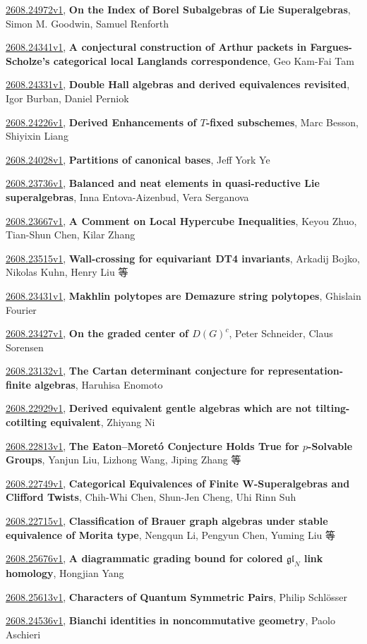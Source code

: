 \documentclass[9pt, a4paper]{article}
\theoremstyle{plain}
\theoremstyle{definition}
\theoremstyle{remark}
\newcommand{\arxiv}[3]{\href{https://arxiv.org/abs/#1}{#1}, \textbf{\textcolor{arxivblue}{#2}}, #3}
\begin{document}
\arxiv{2608.24972v1}{On the Index of Borel Subalgebras of Lie Superalgebras}{Simon M. Goodwin, Samuel Renforth}

\arxiv{2608.24341v1}{A conjectural construction of Arthur packets in Fargues-Scholze's categorical local Langlands correspondence}{Geo Kam-Fai Tam}

\arxiv{2608.24331v1}{Double Hall algebras and derived equivalences revisited}{Igor Burban, Daniel Perniok}

\arxiv{2608.24226v1}{Derived Enhancements of $T$-fixed subschemes}{Marc Besson, Shiyixin Liang}

\arxiv{2608.24028v1}{Partitions of canonical bases}{Jeff York Ye}

\arxiv{2608.23736v1}{Balanced and neat elements in quasi-reductive Lie superalgebras}{Inna Entova-Aizenbud, Vera Serganova}

\arxiv{2608.23667v1}{A Comment on Local Hypercube Inequalities}{Keyou Zhuo, Tian-Shun Chen, Kilar Zhang}

\arxiv{2608.23515v1}{Wall-crossing for equivariant DT4 invariants}{Arkadij Bojko, Nikolas Kuhn, Henry Liu 等}

\arxiv{2608.23431v1}{Makhlin polytopes are Demazure string polytopes}{Ghislain Fourier}

\arxiv{2608.23427v1}{On the graded center of $D(G)^c$}{Peter Schneider, Claus Sorensen}

\arxiv{2608.23132v1}{The Cartan determinant conjecture for representation-finite algebras}{Haruhisa Enomoto}

\arxiv{2608.22929v1}{Derived equivalent gentle algebras which are not tilting-cotilting equivalent}{Zhiyang Ni}

\arxiv{2608.22813v1}{The Eaton--Moretó Conjecture Holds True for \(p\)-Solvable Groups}{Yanjun Liu, Lizhong Wang, Jiping Zhang 等}

\arxiv{2608.22749v1}{Categorical Equivalences of Finite W-Superalgebras and Clifford Twists}{Chih-Whi Chen, Shun-Jen Cheng, Uhi Rinn Suh}

\arxiv{2608.22715v1}{Classification of Brauer graph algebras under stable equivalence of Morita type}{Nengqun Li, Pengyun Chen, Yuming Liu 等}

\arxiv{2608.25676v1}{A diagrammatic grading bound for colored $\mathfrak{gl}_N$ link homology}{Hongjian Yang}

\arxiv{2608.25613v1}{Characters of Quantum Symmetric Pairs}{Philip Schlösser}

\arxiv{2608.24536v1}{Bianchi identities in noncommutative geometry}{Paolo Aschieri}
\end{document}
